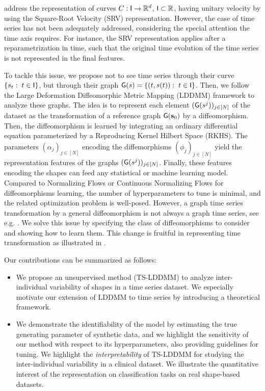  \citet{srivastava2010shape,heo2024logistic} address the representation of curves $C:\mathsf{I} \to \mathbb{R}^d$, $\mathsf{I}\subset \mathbb{R}$, having unitary velocity by using the Square-Root Velocity (SRV) representation.
 However, the case of time series has not been adequately addressed, considering the special attention the time axis requires.
 For instance, the SRV representation applies after a reparametrization in time, such that the original time evolution of the time series is not represented in the final features.

 To tackle this issue, we propose not to see time series through their curve $\{s_t:\; t\in\mathsf{I}\}$, but through their graph $\mathsf{G}(s)=\{(t,s(t)):\; t\in \mathsf{I}\} $. 
 Then, we follow the Large Deformation Diffeomorphic Metric Mapping (LDDMM) framework \cite{beg2005computing,vaillant2004statistics} to analyze these graphs.
  The idea is to represent each element $(\mathsf{G}(s^j))_{j\in[N]}$ of the dataset as the transformation of a reference graph $\mathsf{G}(\mathbf{s}_0)$ by a diffeomorphism.
  Then, the diffeomorphism is learned by integrating an ordinary differential equation parameterized by a Reproducing Kernel Hilbert Space (RKHS).
   The parameters $(\alpha_j)_{j\in[N]}$ encoding the diffemorphisms $(\phi_j)_{j\in[N]}$ yield the representation features of the graphs $(\mathsf{G}(s^j))_{j\in[N]}$.
    Finally, these features encoding the shapes can feed any statistical or machine learning model.
   Compared to Normalizing Flows \cite{rezende2015variational,kobyzev2020normalizing} or Continuous Normalizing Flows \cite{chen2018neural,grathwohl2019scalable,salman2018deep} for diffeomorphisms learning, the number of hyperparameters to tune is minimal, and the related optimization problem is well-posed.
   However, a graph time series transformation by a general diffeomorphism is not always a graph time series, see e.g. .
    We solve this issue by specifying the class of diffeomorphisms to consider and showing how to learn them.
     This change is fruitful in representing time transformation as illustrated in .

     Our contributions can be summarized as follows:
     \begin{itemize}
       \item We propose an unsupervised method (TS-LDDMM) to analyze inter-individual variability of shapes in a time series dataset.
       We especially motivate our extension of LDDMM to time series by introducing a theoretical framework.
       \item We demonstrate the identifiability of the model by estimating the true generating parameter of synthetic data, and we highlight the sensitivity of our method with respect to its hyperparameters, also providing guidelines for tuning.
       We highlight the \textit{interpretability} of TS-LDDMM for studying the inter-individual variability in a clinical dataset.
        We illustrate the quantitative interest of the representation on classification tasks on real shape-based datasets.
        
     \end{itemize}


